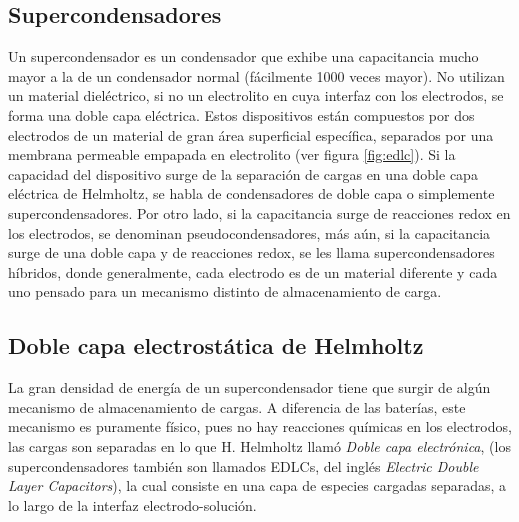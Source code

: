 %

\subsection{Supercondensadores}
Un supercondensador es un condensador que exhibe una capacitancia mucho mayor a la de un condensador normal (fácilmente 1000 veces mayor). No utilizan un material dieléctrico, si no un electrolito en cuya interfaz con los electrodos, se forma una doble capa eléctrica. Estos dispositivos están compuestos por dos electrodos de un material de gran área superficial específica, separados por una membrana permeable empapada en electrolito (ver figura \ref{fig:edlc}). Si la capacidad del dispositivo surge de la separación de cargas en una doble capa eléctrica de Helmholtz, se habla de condensadores de doble capa o simplemente supercondensadores. Por otro lado, si la capacitancia surge de reacciones redox en los electrodos, se denominan pseudocondensadores, más aún, si la capacitancia surge de una doble capa y de reacciones redox, se  les llama supercondensadores híbridos, donde generalmente, cada electrodo es de un material diferente y cada uno pensado para un mecanismo distinto de almacenamiento de carga.

\subsection{Doble capa electrostática de Helmholtz}
La gran densidad de energía de un supercondensador tiene que surgir de algún mecanismo de almacenamiento de cargas. A diferencia de las baterías, este mecanismo es puramente físico, pues no hay reacciones químicas en los electrodos, las cargas son separadas en lo que H. Helmholtz llamó \emph{Doble capa electrónica}, (los supercondensadores también son llamados EDLCs, del inglés \emph{Electric Double Layer Capacitors}), la cual consiste en una capa de especies cargadas separadas, a lo largo de la interfaz electrodo-solución\citep{Frackowiak2001}. 



